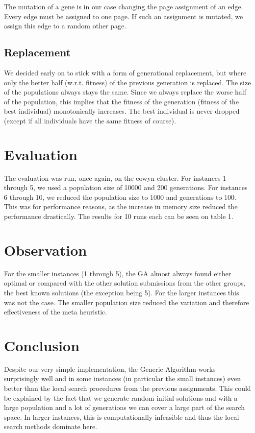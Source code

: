 \documentclass [11pt]{article}
\begin{document}
The mutation of a gene is in our case changing the page assignment of an edge. Every edge must be assigned to one page. If such an assignment is mutated, we assign this edge to a random other page.

\subsection{Replacement}
We decided early on to stick with a form of generational replacement, but where only the better  half  (w.r.t. fitness) of the previous generation is replaced. The size of the populations always stays the same. Since we always replace the worse half of the population, this implies that the fitness of the generation (fitness of the best individual) monotonically increases. The best individual is never dropped (except if all individuals have the same fitness of course).

\section{Evaluation}

The evaluation was run, once again, on the eowyn cluster. For instances 1 through 5, we used a population size of 10000 and 200 generations. For instances 6 through 10, we reduced the population size to 1000 and generations to 100. This was for performance reasons, as the increase in memory size reduced the performance drastically. The results for 10 runs each can be seen on table 1.


\section{Observation}
For the smaller instances (1 through 5), the GA almost always found either optimal or compared with the other solution submissions from the other groups, the best known solutions (the exception being 5). For the larger instances this was not the case. The smaller population size reduced the variation and therefore effectiveness of the meta heuristic. 

\section{Conclusion}

Despite our very simple implementation, the Generic Algorithm works surprisingly well and in some instances (in particular the small instances) even better than the local search procedures from the previous assignments. This could be explained by the fact that we generate random initial solutions and with a large population and a lot of generations we can cover a large part of the search space. In larger instances, this is computationally infeasible and thus the local search methods dominate here. 
\end{document}
